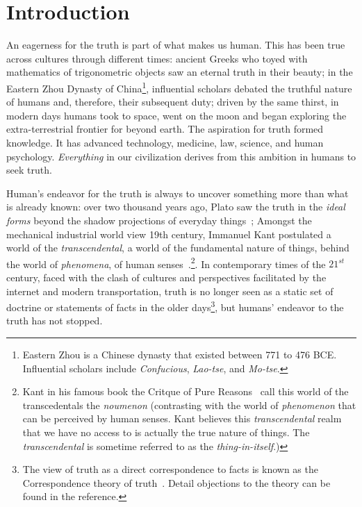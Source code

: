 
\chapter{Introduction}

An eagerness for the truth is part of what makes us human. This has been true across cultures through different times: ancient Greeks who toyed with mathematics of trigonometric objects saw an eternal truth in their beauty; in the Eastern Zhou Dynasty of China\footnote{Eastern Zhou is a Chinese dynasty that existed between 771 to 476 BCE. Influential scholars include \textit{Confucious}, \textit{Lao-tse}, and \textit{Mo-tse}.}, influential scholars debated the truthful nature of humans and,
therefore, their subsequent duty; driven by the same thirst, in modern days humans took to space, went on the moon and began exploring the extra-terrestrial frontier for beyond earth. The aspiration for truth formed knowledge. It has advanced technology, medicine, law, science, and human psychology. \textit{Everything} in our civilization derives from this ambition in humans to seek truth.


Human's endeavor for the truth is always to uncover something more than what is already known: over two thousand years ago, Plato saw the truth in the \textit{ideal forms} beyond the shadow projections of everyday things~\cite{plato1961republic}; Amongst the mechanical industrial world view 19th century, Immanuel Kant postulated a world of the \textit{transcendental},  a world of the fundamental
nature of things, behind the world of \textit{phenomena}, of human senses~\cite{kant1908critique}.\footnote{Kant in his famous book the Critque of Pure Reasons~\cite{kant1908critique} call this world of the transcedentals the \textit{noumenon} (contrasting with the world
of \textit{phenomenon} that can be perceived by human senses.
Kant believes this \textit{transcendental} realm that we have no access to is actually the true nature of things. The \textit{transcendental} is sometime referred to as the \textit{thing-in-itself}.)}. In contemporary times of the $21^{st}$ century, faced with the clash of cultures and perspectives facilitated by the internet and modern transportation, truth is no longer seen as a static set of doctrine or statements of facts in the older days\footnote{The view of truth as a
direct correspondence to facts is known as the Correspondence theory
of truth~\cite{sep-truth-correspondence}. Detail objections to the theory can be found in the reference.}, but humans' endeavor to the truth has not stopped.

